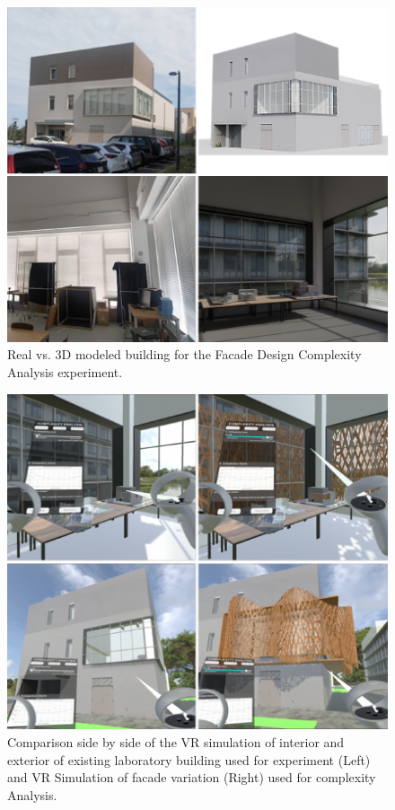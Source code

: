     \begin{figure}[htb]
        \centering
        \includegraphics[width= \linewidth]{Images/Realvs3DmodelBlender}
        \caption{Real vs. 3D modeled building for the Facade Design Complexity Analysis experiment.}
        \label{fig:RealVs3dModel}
    \end{figure}

    \begin{figure}[htb]
        \centering
        \includegraphics[width= \linewidth]{Images/VRInteriorExterior}
        \caption{Comparison side by side of the VR simulation of interior and exterior of existing laboratory building used for experiment (Left) and VR Simulation of facade variation (Right) used for complexity Analysis.}
        \label{fig:VRInteriorExterior}
    \end{figure}


